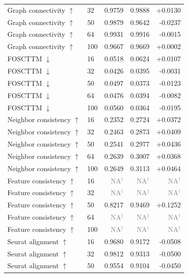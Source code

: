\documentclass[10pt]{article}
\begin{document}
\begin{landscape}
\begin{longtable}{@{}llrrr@{}}
Graph connectivity $\uparrow$ & 32 & 0.9759 & 0.9888 & +0.0130 \\
Graph connectivity $\uparrow$ & 50 & 0.9879 & 0.9642 & -0.0237 \\
Graph connectivity $\uparrow$ & 64 & 0.9931 & 0.9916 & -0.0015 \\
Graph connectivity $\uparrow$ & 100 & 0.9667 & 0.9669 & +0.0002 \\
\addlinespace
FOSCTTM $\downarrow$ & 16 & 0.0518 & 0.0624 & +0.0107 \\
FOSCTTM $\downarrow$ & 32 & 0.0426 & 0.0395 & -0.0031 \\
FOSCTTM $\downarrow$ & 50 & 0.0497 & 0.0373 & -0.0123 \\
FOSCTTM $\downarrow$ & 64 & 0.0476 & 0.0394 & -0.0082 \\
FOSCTTM $\downarrow$ & 100 & 0.0560 & 0.0364 & -0.0195 \\
\addlinespace
Neighbor consistency $\uparrow$ & 16 & 0.2352 & 0.2724 & +0.0372 \\
Neighbor consistency $\uparrow$ & 32 & 0.2463 & 0.2873 & +0.0409 \\
Neighbor consistency $\uparrow$ & 50 & 0.2541 & 0.2977 & +0.0436 \\
Neighbor consistency $\uparrow$ & 64 & 0.2639 & 0.3007 & +0.0368 \\
Neighbor consistency $\uparrow$ & 100 & 0.2649 & 0.3113 & +0.0464 \\
\addlinespace
Feature consistency $\uparrow$ & 16 & \textcolor{gray}{NA$^{\dagger}$} & \textcolor{gray}{NA$^{\dagger}$} & \textcolor{gray}{NA$^{\dagger}$} \\
Feature consistency $\uparrow$ & 32 & \textcolor{gray}{NA$^{\dagger}$} & \textcolor{gray}{NA$^{\dagger}$} & \textcolor{gray}{NA$^{\dagger}$} \\
Feature consistency $\uparrow$ & 50 & 0.8217 & 0.9469 & +0.1252 \\
Feature consistency $\uparrow$ & 64 & \textcolor{gray}{NA$^{\dagger}$} & \textcolor{gray}{NA$^{\dagger}$} & \textcolor{gray}{NA$^{\dagger}$} \\
Feature consistency $\uparrow$ & 100 & \textcolor{gray}{NA$^{\dagger}$} & \textcolor{gray}{NA$^{\dagger}$} & \textcolor{gray}{NA$^{\dagger}$} \\
\addlinespace
Seurat alignment $\uparrow$ & 16 & 0.9680 & 0.9172 & -0.0508 \\
Seurat alignment $\uparrow$ & 32 & 0.9812 & 0.9313 & -0.0500 \\
Seurat alignment $\uparrow$ & 50 & 0.9554 & 0.9104 & -0.0450 \\

\end{longtable}
\end{landscape}
\end{document}
